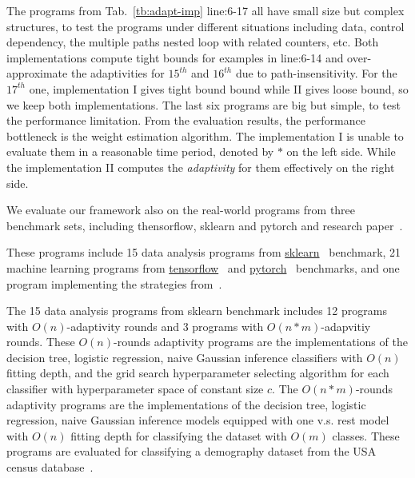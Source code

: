 %
The programs from Tab.~\ref{tb:adapt-imp} line:6-17 all have small size but complex structures, to test the programs under different situations including
data, control dependency,
the multiple paths nested loop with related counters, etc.
Both implementations compute tight bounds for examples in line:6-14
and over-approximate the adaptivities for $15^{th}$ and $16^{th}$ due to path-insensitivity.
For the $17^{th}$ one, implementation I gives tight bound bound while II gives loose bound, so we keep both implementations.
The last six programs are big but simple,
to test the performance limitation. 
From the evaluation results, the performance bottleneck is the weight estimation algorithm.
The implementation I
is unable to evaluate them in a reasonable time period, denoted by $*$ on the left side.
While the implementation II computes the \emph{adaptivity} for
them effectively on the right side. 




We evaluate our framework also on the real-world programs from
three benchmark sets, including thensorflow, sklearn and pytorch and research paper~\cite{Jamieson2015TheAO}.

These programs include  
15 data analysis programs 
from \hyperlink{https://github.com/scikit-learn/scikit-learn/tree/main/examples}{sklearn}~\cite{SklearnBenchmark} benchmark,
21 machine learning programs
from \hyperlink{https://github.com/tensorflow/tensorflow/tree/master/tensorflow/examples}{tensorflow}~\cite{TensorflowBenchmark} 
and \hyperlink{https://github.com/pytorch/pytorch}{pytorch}~\cite{PytorchBenchmark}
benchmarks,
and {one program implementing the strategies from~\cite{Jamieson2015TheAO}}.

The 15 data analysis programs 
from sklearn benchmark includes 12 programs with $O(n)$-adaptivity rounds
and 3 programs with $O(n*m)$-adapvitiy rounds.
These $O(n)$-rounds adaptivity programs are
the
implementations of the decision tree, logistic regression, naive Gaussian inference classifiers
with $O(n)$ fitting depth,
and the grid search hyperparameter selecting algorithm for each classifier with 
hyperparameter space of constant size $c$.
The $O(n*m)$-rounds adaptivity programs are
the implementations of the  decision tree, logistic regression, naive Gaussian inference models equipped with one v.s. rest model with $O(n)$ fitting depth for classifying the dataset with $O(m)$ classes.
These programs are evaluated for classifying a demography dataset from 
the USA census database~\cite{CensusDatabase}.


